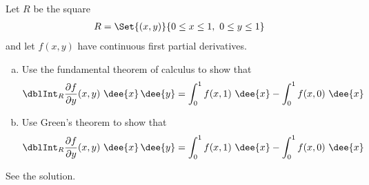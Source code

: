 

\subsection*{\Conceptual}

\begin{question}
Let $R$ be the square
\begin{align*}
R=\Set{(x,y)}{0\le x\le 1,\ 0\le y\le 1}
\end{align*}
and let $f(x,y)$ have continuous first partial derivatives.
\begin{enumerate}[(a)]
\item
Use the fundamental theorem of calculus to show that
\begin{align*}
\dblInt_R\frac{\partial f}{\partial y}(x,y)\ \dee{x}\,\dee{y}
=\int_0^1 f(x,1)\ \dee{x}
  - \int_0^1 f(x,0)\ \dee{x}
\end{align*}
\item
Use Green's theorem to show that
\begin{align*}
\dblInt_R\frac{\partial f}{\partial y}(x,y)\ \dee{x}\,\dee{y}
=\int_0^1 f(x,1)\ \dee{x}
  - \int_0^1 f(x,0)\ \dee{x}
\end{align*}
\end{enumerate}
\end{question}

%

\begin{answer}
See the solution.
\end{answer}

